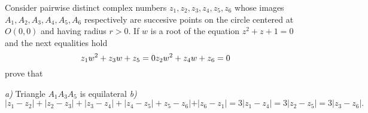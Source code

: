 Consider pairwise distinct complex numbers $z_1,z_2,z_3,z_4,z_5,z_6$ whose images $A_1,A_2,A_3,A_4,A_5,A_6$ respectively are succesive points on the circle centered at $O(0,0)$ and having radius $r>0.$
If $w$ is a root of the equation $z^2+z+1=0$ and the next equalities hold \[z_1w^2+z_3w+z_5=0 \\ z_2w^2+z_4w+z_6=0\] prove that

\textit{a)} Triangle $A_1A_3A_5$ is equilateral
\textit{b)} \[|z_1-z_2|+|z_2-z_3|+|z_3-z_4|+|z_4-z_5|+z_5-z_6|+|z_6-z_1|=3|z_1-z_4|=3|z_2-z_5|=3|z_3-z_6|.\]